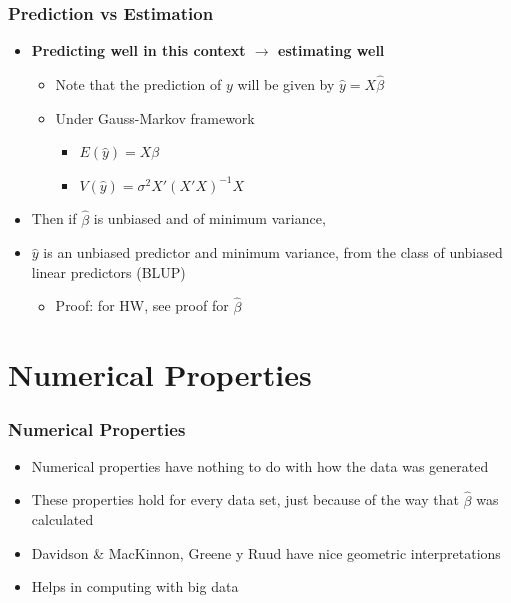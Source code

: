 \documentclass[
  shownotes,
  xcolor={svgnames},
  hyperref={colorlinks,citecolor=DarkBlue,linkcolor=DarkRed,urlcolor=DarkBlue}
  , aspectratio=169]{beamer}
\begin{document}
\begin{frame}
\frametitle{Prediction vs Estimation}

\begin{itemize}
\item {\bf Predicting well in this context $\rightarrow$ estimating well}

  \bigskip 
\begin{itemize}
  \item Note that the prediction of $y$ will be given by $\hat y=X \hat \beta$
  \bigskip 
  \item Under Gauss-Markov framework
  \medskip 
  \begin{itemize}
    \item $E(\hat y) = X\beta$
    \medskip 
    \item $V(\hat y ) = \sigma^2 X' (X'X)^{-1} X$
  \end{itemize}
\end{itemize}

  \bigskip 

\item Then if $\hat \beta$ is unbiased and of minimum variance, 
\item $\hat y$ is an unbiased predictor and minimum variance, from the class of unbiased linear predictors (BLUP)
  \begin{itemize}
    \tiny 
    \item Proof: for HW, see proof for $\hat \beta$ 
  \end{itemize}
\end{itemize}
\end{frame}

\section{Numerical Properties}
\begin{frame}
\frametitle{Numerical Properties}

\begin{itemize}
  \item Numerical properties have nothing to do with how the data was generated
  \bigskip
  \item These properties hold for every data set, just because of the way that $\hat \beta$ was calculated
  \bigskip
  \item Davidson \& MacKinnon, Greene y Ruud have nice geometric interpretations
  \bigskip
  \item Helps in computing with big data
  
\end{itemize}
\end{frame}
\end{document}

